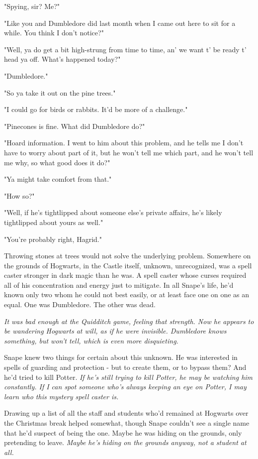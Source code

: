 "Spying, sir? Me?"

"Like you and Dumbledore did last month when I came out here to sit for a while. You think I don't notice?"

"Well, ya do get a bit high-strung from time to time, an' we want t' be ready t' head ya off. What's happened today?"

"Dumbledore."

"So ya take it out on the pine trees."

"I could go for birds or rabbits. It'd be more of a challenge."

"Pinecones is fine. What did Dumbledore do?"

"Hoard information. I went to him about this{\el} problem, and he tells me I don't have to worry about part of it, but he won't tell me which part, and he won't tell me why, so what good does it do?"

"Ya might take comfort from that."

"How so?"

"Well, if he's tightlipped about someone else's private affairs, he's likely tightlipped about yours as well."

"You're probably right, Hagrid."

Throwing stones at trees would not solve the underlying problem. Somewhere on the grounds of Hogwarts, in the Castle itself, unknown, unrecognized, was a spell caster stronger in dark magic than he was. A spell caster whose curses required all of his concentration and energy just to mitigate. In all Snape's life, he'd known only two whom he could not best easily, or at least face one on one as an equal. One was Dumbledore. The other was dead.

\emph{It was bad enough at the Quidditch game, feeling that strength. Now he appears to be wandering Hogwarts at will, as if he were invisible. Dumbledore knows something, but won't tell, which is even more disquieting.}

Snape knew two things for certain about this unknown. He was interested in spells of guarding and protection - but to create them, or to bypass them? And he'd tried to kill Potter. \emph{If he's still trying to kill Potter, he may be watching him constantly. If I can spot someone who's always keeping an eye on Potter, I may learn who this mystery spell caster is.}

Drawing up a list of all the staff and students who'd remained at Hogwarts over the Christmas break helped somewhat, though Snape couldn't see a single name that he'd suspect of being the one. Maybe he was hiding on the grounds, only pretending to leave. \emph{Maybe he's hiding on the grounds anyway, not a student at all.}

